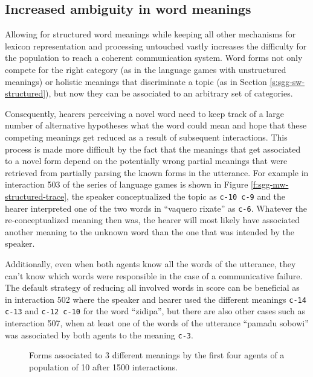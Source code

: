\subsection{Increased ambiguity in word meanings}


Allowing for structured word meanings while keeping all other
mechanisms for lexicon representation and processing untouched vastly
increases the difficulty for the population to reach a coherent
communication system. Word forms not only compete for the right
category (as in the language games with unstructured meanings) or
holistic meanings that discriminate a topic (as in Section
\ref{s:sgg-sw-structured}), but now they can be associated to an
arbitrary set of categories. 


Consequently, hearers perceiving a novel word need to keep track of a
large number of alternative hypotheses what the word could mean and
hope that these competing meanings get reduced as a result of
subsequent interactions.  This process is made more difficult by the
fact that the meanings that get associated to a novel form depend on
the potentially wrong partial meanings that were retrieved from
partially parsing the known forms in the utterance. For example in
interaction 503 of the series of language games is shown in Figure
\ref{f:sgg-mw-structured-trace}, the speaker conceptualized the topic
as \texttt{c-10 c-9} and the hearer interpreted one of the two words
in ``vaquero rixate'' as \texttt{c-6}. Whatever the re-conceptualized
meaning then was, the hearer will most likely have associated another
meaning to the unknown word than the one that was intended by the
speaker.

Additionally, even when both agents know all the words of the
utterance, they can't know which words were responsible in the case of
a communicative failure. The default strategy of reducing all involved
words in score can be beneficial as in interaction 502 where the
speaker and hearer used the different meanings \texttt{c-14 c-13} and
\texttt{c-12 c-10} for the word ``zidipa'', but there are also other
cases such as interaction 507, when at least one of the words of the
utterance ``pamadu sobowi'' was associated by both agents to the
meaning \texttt{c-3}.

\startfiguregroup

\begin{figure}[t]
  
  \caption{Forms associated to 3 different meanings by the first four
    agents of a population of 10 after 1500 interactions.}
  \label{f:sgg-mw-structured-lexicon-meanings-1500}
\end{figure}

